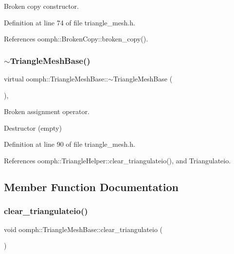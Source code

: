 Broken copy constructor. 



Definition at line 74 of file triangle\+\_\+mesh.\+h.



References oomph\+::\+Broken\+Copy\+::broken\+\_\+copy().

\mbox{\label{classoomph_1_1TriangleMeshBase_af827bac0e7a180b179a835c4db2a8228}} 
\subsubsection{\texorpdfstring{$\sim$\+Triangle\+Mesh\+Base()}{~TriangleMeshBase()}}
{\footnotesize\ttfamily virtual oomph\+::\+Triangle\+Mesh\+Base\+::$\sim$\+Triangle\+Mesh\+Base (\begin{DoxyParamCaption}{ }\end{DoxyParamCaption})\hspace{0.3cm}{\ttfamily [inline]}, {\ttfamily [virtual]}}



Broken assignment operator. 

Destructor (empty) 

Definition at line 90 of file triangle\+\_\+mesh.\+h.



References oomph\+::\+Triangle\+Helper\+::clear\+\_\+triangulateio(), and Triangulateio.



\subsection{Member Function Documentation}
\mbox{\label{classoomph_1_1TriangleMeshBase_a5108f2cdaf673454bbab831da4fbacd5}} 
\subsubsection{\texorpdfstring{clear\+\_\+triangulateio()}{clear\_triangulateio()}}
{\footnotesize\ttfamily void oomph\+::\+Triangle\+Mesh\+Base\+::clear\+\_\+triangulateio (\begin{DoxyParamCaption}{ }\end{DoxyParamCaption})\hspace{0.3cm}{\ttfamily [inline]}}



